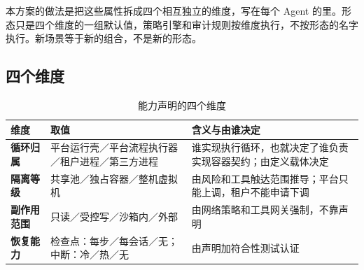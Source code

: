 本方案的做法是把这些属性拆成四个相互独立的维度，写在每个 Agent 的里。形态只是四个维度的一组默认值，策略引擎和审计规则按维度执行，不按形态的名字执行。新场景等于新的组合，不是新的形态。

\subsection{四个维度}

\begin{table}[htbp]
\centering
\caption{能力声明的四个维度}
\label{tab:axes}
\begin{tabularx}{\textwidth}{@{}>{\bfseries}L{2.6cm}L{6.4cm}Y@{}}
  \toprule
  \textbf{维度} & \textbf{取值} & \textbf{含义与由谁决定}\\
  \midrule
  循环归属  & 平台运行壳／平台流程执行器／租户进程／第三方进程 & 谁实现执行循环，也就决定了谁负责实现容器契约；由定义载体决定\\
  隔离等级  & 共享池／独占容器／整机虚拟机 & 由风险和工具触达范围推导；平台只能上调，租户不能申请下调\\
  副作用范围  & 只读／受控写／沙箱内／外部 & 由网络策略和工具网关强制，不靠声明\\
  恢复能力  & 检查点：每步／每会话／无；中断：冷／热／无 & 由声明加符合性测试认证\\
  \bottomrule
\end{tabularx}
\end{table}

